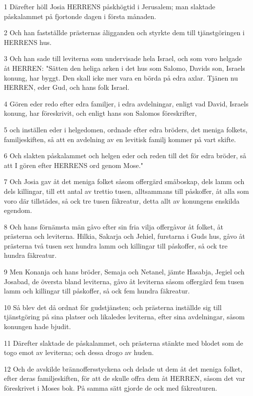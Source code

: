 \par 1 Därefter höll Josia HERRENS påskhögtid i Jerusalem; man slaktade påskalammet på fjortonde dagen i första månaden.
\par 2 Och han fastställde prästernas åligganden och styrkte dem till tjänstgöringen i HERRENS hus.
\par 3 Och han sade till leviterna som undervisade hela Israel, och som voro helgade åt HERREN: "Sätten den heliga arken i det hus som Salomo, Davids son, Israels konung, har byggt. Den skall icke mer vara en börda på edra axlar. Tjänen nu HERREN, eder Gud, och hans folk Israel.
\par 4 Gören eder redo efter edra familjer, i edra avdelningar, enligt vad David, Israels konung, har föreskrivit, och enligt hans son Salomos föreskrifter,
\par 5 och inställen eder i helgedomen, ordnade efter edra bröders, det meniga folkets, familjeskiften, så att en avdelning av en levitisk familj kommer på vart skifte.
\par 6 Och slakten påskalammet och helgen eder och reden till det för edra bröder, så att I gören efter HERRENS ord genom Mose."
\par 7 Och Josia gav åt det meniga folket såsom offergärd småboskap, dels lamm och dels killingar, till ett antal av trettio tusen, alltsammans till påskoffer, åt alla som voro där tillstädes, så ock tre tusen fäkreatur, detta allt av konungens enskilda egendom.
\par 8 Och hans förnämsta män gåvo efter sin fria vilja offergåvor åt folket, åt prästerna och leviterna. Hilkia, Sakarja och Jehiel, furstarna i Guds hus, gåvo åt prästerna två tusen sex hundra lamm och killingar till påskoffer, så ock tre hundra fäkreatur.
\par 9 Men Konanja och hans bröder, Semaja och Netanel, jämte Hasabja, Jegiel och Josabad, de översta bland leviterna, gåvo åt leviterna såsom offergärd fem tusen lamm och killingar till påskoffer, så ock fem hundra fäkreatur.
\par 10 Så blev det då ordnat för gudstjänsten; och prästerna inställde sig till tjänstgöring på sina platser och likaledes leviterna, efter sina avdelningar, såsom konungen hade bjudit.
\par 11 Därefter slaktade de påskalammet, och prästerna stänkte med blodet som de togo emot av leviterna; och dessa drogo av huden.
\par 12 Och de avskilde brännoffersstyckena och delade ut dem åt det meniga folket, efter deras familjeskiften, för att de skulle offra dem åt HERREN, såsom det var föreskrivet i Moses bok. På samma sätt gjorde de ock med fäkreaturen.
